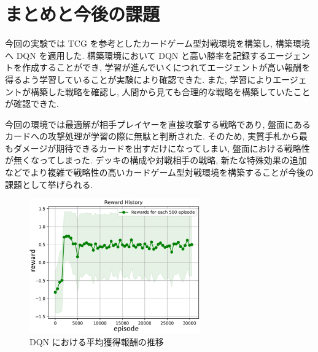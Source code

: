 \documentclass[twocolumn]{jarticle}
\begin{document}
\section{まとめと今後の課題}
今回の実験では TCG を参考としたカードゲーム型対戦環境を構築し, 構築環境へ DQN を適用した. 構築環境において DQN と高い勝率を記録するエージェントを作成することができ, 学習が進んでいくにつれてエージェントが高い報酬を得るよう学習していることが実験により確認できた. また, 学習によりエージェントが構築した戦略を確認し, 人間から見ても合理的な戦略を構築していたことが確認できた.
\par
今回の環境では最適解が相手プレイヤーを直接攻撃する戦略であり, 盤面にあるカードへの攻撃処理が学習の際に無駄と判断された. そのため, 実質手札から最もダメージが期待できるカードを出すだけになってしまい, 盤面における戦略性が無くなってしまった. デッキの構成や対戦相手の戦略, 新たな特殊効果の追加などでより複雑で戦略性の高いカードゲーム型対戦環境を構築することが今後の課題として挙げられる.

\begin{figure}[t]
  \centering
  \small
  \includegraphics[width=73.5mm]{assets/graph.eps}
  \caption{DQN における平均獲得報酬の推移}
  \label{fig:DQNresult}
\end{figure}






\end{document}
